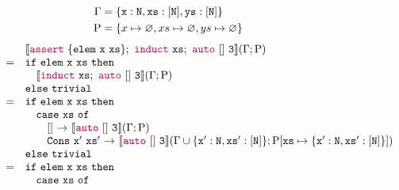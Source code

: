 \begin{figure*}
  \begin{minipage}{\textwidth}
    \begin{align*}
      \Gamma &= \{ \mathtt{x}:\mathtt{N}, \mathtt{xs}:\mathtt{[N]}, \mathtt{ys}:\mathtt{[N]} \} \\
      \mathrm{P} &= \{ x \mapsto \varnothing, xs \mapsto \varnothing, ys \mapsto \varnothing \} 
    \end{align*}
    \begin{align*} \begin{array}{rl}
      & \llbracket  {\color{purple}\ensuremath{\mathtt{assert}}}~\{\mathtt{elem~x~xs}\} ; ~
          {\color{purple}\mathtt{induct}}~\mathtt{xs} ; ~
          {\color{purple}\mathtt{auto}}~\mathtt{[]}~\mathtt{3}
         \rrbracket ( \Gamma ; \mathrm{P} )
      \\ =&
        \mathtt{if}~\mathtt{elem~x~xs}~\mathtt{then}
        \\& \hspace{1em} 
          \llbracket  {\color{purple}\ensuremath{\mathtt{induct}}}~\mathtt{xs} ; ~
              {\color{purple}\mathtt{auto}}~\mathtt{[]}~\mathtt{3}
             \rrbracket ( \Gamma ; \mathrm{P} )
        \\& \mathtt{else}~\mathtt{trivial}
      \\ =&
        \mathtt{if}~\mathtt{elem~x~xs}~\mathtt{then}
        \\& \hspace{1em} 
          \mathtt{case}~\mathtt{xs}~\mathtt{of}
          \\& \hspace{2em}
            \mathtt{[]}~\mathtt{\rightarrow}~
            \llbracket  {\color{purple}\ensuremath{\mathtt{auto}}}~\mathtt{[]}~\mathtt{3}  \rrbracket ( \Gamma ; \mathrm{P} )
            \\& \hspace{2em}
            \mathtt{Cons~x'~xs'}~\mathtt{\rightarrow}~
            \llbracket  {\color{purple}\ensuremath{\mathtt{auto}}}~\mathtt{[]}~\mathtt{3}  \rrbracket ( \Gamma \cup \{\mathtt{x'}:\mathtt{N}, \mathtt{xs'}:\mathtt{[N]}\}; \mathrm{P}[ \mathtt{xs} \mapsto \{ \mathtt{x'}:\mathtt{N}, \mathtt{xs'}:\mathtt{[N]} \} ] )
        \\& \mathtt{else}~\mathtt{trivial}
      \\ =&
        \mathtt{if}~\mathtt{elem~x~xs}~\mathtt{then}
        \\& \hspace{1em} 
          \mathtt{case}~\mathtt{xs}~\mathtt{of}
          \\& \hspace{2em}

\end{array}
\end{align*}
\end{minipage}
\end{figure*}
